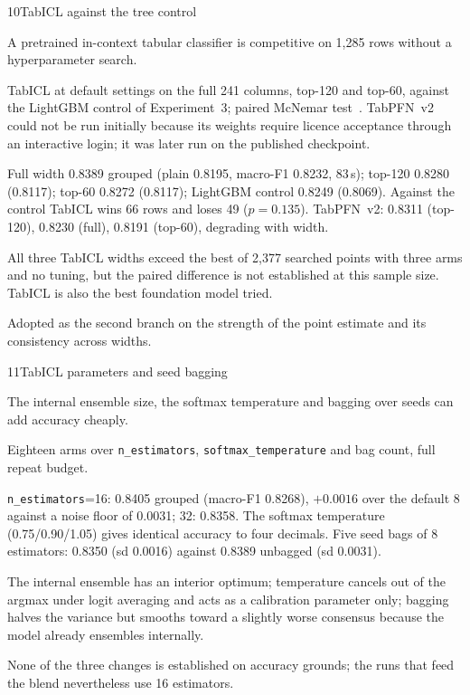  
\begin{explog}{10}{TabICL against the tree control}
\item[Hypothesis] A pretrained in-context tabular classifier is competitive on 1{,}285 rows
without a hyperparameter search.
\item[Method] TabICL at default settings on the full 241 columns, top-120 and top-60,
against the LightGBM control of Experiment~3; paired McNemar test~\cite{mcnemar}.
TabPFN~v2~\cite{tabpfn} could not be run initially because its weights require
licence acceptance through an interactive login; it was later run on the published
checkpoint.
\item[Result] Full width 0.8389 grouped (plain 0.8195, macro-F1 0.8232, 83\,s); top-120
0.8280 (0.8117); top-60 0.8272 (0.8117); LightGBM control 0.8249 (0.8069). Against
the control TabICL wins 66 rows and loses 49 ($p=0.135$). TabPFN~v2: 0.8311
(top-120), 0.8230 (full), 0.8191 (top-60), degrading with width.
\item[Inference] All three TabICL widths exceed the best of 2{,}377 searched points with
three arms and no tuning, but the paired difference is not established at this
sample size. TabICL is also the best foundation model tried.
\item[Verdict] Adopted as the second branch on the strength of the point estimate and
its consistency across widths.
\end{explog}

\begin{explog}{11}{TabICL parameters and seed bagging}
\item[Hypothesis] The internal ensemble size, the softmax temperature and bagging over seeds
can add accuracy cheaply.
\item[Method] Eighteen arms over \texttt{n\_estimators}, \texttt{softmax\_temperature}
and bag count, full repeat budget.
\item[Result] \texttt{n\_estimators}=16: 0.8405 grouped (macro-F1 0.8268), $+0.0016$ over
the default 8 against a noise floor of 0.0031; 32: 0.8358. The softmax temperature
(0.75/0.90/1.05) gives identical accuracy to four decimals. Five seed bags of 8
estimators: 0.8350 (sd 0.0016) against 0.8389 unbagged (sd 0.0031).
\item[Inference] The internal ensemble has an interior optimum; temperature cancels out of the
argmax under logit averaging and acts as a calibration parameter only; bagging
halves the variance but smooths toward a slightly worse consensus because the model
already ensembles internally.
\item[Verdict] None of the three changes is established on accuracy grounds; the
runs that feed the blend nevertheless use 16 estimators.
\end{explog}


